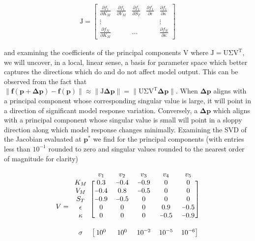 \begin{align}
  \mathrm{J} = \begin{bmatrix} \frac{\partial f_1}{\partial K_M} & \frac{\partial f_1}{\partial V_M} & \frac{\partial f_1}{\partial S_T} & \frac{\partial f_1}{\partial \epsilon} & \frac{\partial f_1}{\partial \kappa} \\ \vdots & & & & \vdots \\ \frac{\partial f_N}{\partial K_M} & & \hdots & & \frac{\partial f_N}{\partial \kappa} \end{bmatrix}
\end{align}

and examining the coefficients of the principal components
$\mathrm{V}$ where $\mathrm{J} = \mathrm{U \Sigma V^T}$, we will
uncover, in a local, linear sense, a basis for parameter space which
better captures the directions which do and do not affect model
output. This can be observed from the fact that
$\| \mathbf{f(p + \Delta p) - f(p)} \| \approx \| \mathrm{J}
\mathbf{\Delta p} \| = \| \mathrm{U \Sigma V^T} \mathbf{\Delta p}
\|$. When $\mathbf{\Delta p}$ aligns with a principal component whose
corresponding singular value is large, it will point in a direction of
significant model response variation. Conversely, a
$\mathbf{\Delta p}$ which aligns with a principal component whose
singular value is small will point in a sloppy direction along which
model response changes minimally. Examining the SVD of the Jacobian
evaluated at $\mathbf{p}^*$ we find for the principal components (with
entries less than $10^{-1}$ rounded to zero and singular values
rounded to the nearest order of magnitude for clarity)

\[
  V = \begin{blockarray}{cccccc} & v_1 & v_2 & v_3 & v_4 & v_5
    \\ \begin{block}{c[ccccc]} K_M & 0.3 & \minus 0.4 & \minus 0.9 & 0
      & 0 \\ V_M & \minus 0.4 & 0.8 & \minus 0.5 & 0 & 0 \\ S_T &
      \minus 0.9 & \minus 0.5 & 0 & 0 & 0 \\ \epsilon & 0 & 0 & 0 &
      0.9 & \minus 0.5 \\ \kappa & 0 & 0 & 0 & \minus 0.5 & \minus 0.9
      \\ \end{block} & & & & & \\ \begin{block}{c[ccccc]} \sigma &
      10^0 & 10^0 & 10^{\minus 2} & 10^{\minus 5} & 10^{\minus 6}
      \\ \end{block} \end{blockarray}
\]

